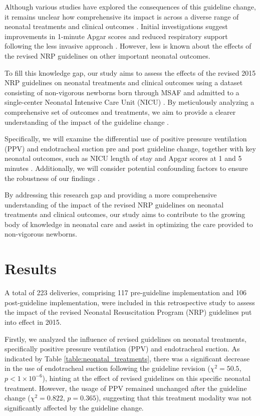 \documentclass[11pt]{article}
\begin{document}
Although various studies have explored the consequences of this guideline change, it remains unclear how comprehensive its impact is across a diverse range of neonatal treatments and clinical outcomes \cite{Smith2019DevelopmentOA, Kapadia2017ImpactOT}. Initial investigations suggest improvements in 1-minute Apgar scores and reduced respiratory support following the less invasive approach \cite{Myers2020ImpactOT}. However, less is known about the effects of the revised NRP guidelines on other important neonatal outcomes.

To fill this knowledge gap, our study aims to assess the effects of the revised 2015 NRP guidelines on neonatal treatments and clinical outcomes using a dataset consisting of non-vigorous newborns born through MSAF and admitted to a single-center Neonatal Intensive Care Unit (NICU) \cite{Vogel2013PatternsAO}. By meticulously analyzing a comprehensive set of outcomes and treatments, we aim to provide a clearer understanding of the impact of the guideline change \cite{Cutumisu2018GrowthMM}. 

Specifically, we will examine the differential use of positive pressure ventilation (PPV) and endotracheal suction pre and post guideline change, together with key neonatal outcomes, such as NICU length of stay and Apgar scores at 1 and 5 minutes \cite{Cipriani2009ComparativeEA, Bech2022RiskFF}. Additionally, we will consider potential confounding factors to ensure the robustness of our findings \cite{Baergen2001MorbidityMA, Cutumisu2018GrowthMM}.

By addressing this research gap and providing a more comprehensive understanding of the impact of the revised NRP guidelines on neonatal treatments and clinical outcomes, our study aims to contribute to the growing body of knowledge in neonatal care and assist in optimizing the care provided to non-vigorous newborns.

\section*{Results}

A total of 223 deliveries, comprising 117 pre-guideline implementation and 106 post-guideline implementation, were included in this retrospective study to assess the impact of the revised Neonatal Resuscitation Program (NRP) guidelines put into effect in 2015.

Firstly, we analyzed the influence of revised guidelines on neonatal treatments, specifically positive pressure ventilation (PPV) and endotracheal suction. As indicated by Table \ref{table:neonatal_treatments}, there was a significant decrease in the use of endotracheal suction following the guideline revision ($\chi^2 = 50.5$, $p < 1 \times 10^{-6}$), hinting at the effect of revised guidelines on this specific neonatal treatment. However, the usage of PPV remained unchanged after the guideline change ($\chi^2 = 0.822$, $p = 0.365$), suggesting that this treatment modality was not significantly affected by the guideline change.
\end{document}
